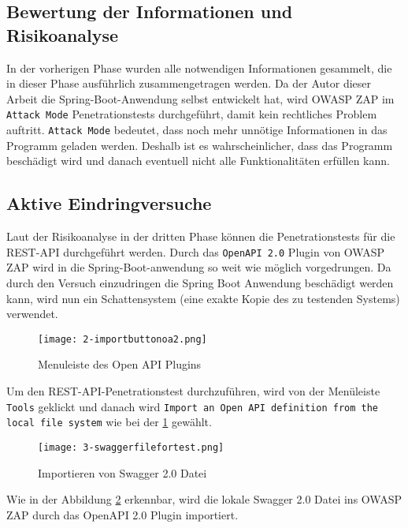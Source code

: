 \subsection{Bewertung der Informationen und Risikoanalyse}

In der vorherigen Phase wurden alle notwendigen Informationen gesammelt, die in dieser Phase ausführlich zusammengetragen werden. Da der Autor dieser Arbeit die Spring-Boot-Anwendung selbst entwickelt hat, wird OWASP ZAP im \texttt{Attack Mode} Penetrationstests durchgeführt, damit kein rechtliches Problem auftritt. \texttt{Attack Mode} bedeutet, dass noch mehr unnötige Informationen in das Programm geladen werden. Deshalb ist es wahrscheinlicher, dass das Programm beschädigt wird und danach eventuell nicht alle Funktionalitäten erfüllen kann.

\subsection{Aktive Eindringversuche}

Laut der Risikoanalyse in der dritten Phase können die Penetrationstests für die REST-API durchgeführt werden. Durch das \texttt{OpenAPI 2.0} Plugin von OWASP ZAP wird in die Spring-Boot-anwendung so weit wie möglich vorgedrungen. Da durch den Versuch einzudringen die Spring Boot Anwendung beschädigt werden kann, wird nun ein Schattensystem (eine exakte Kopie des zu testenden Systems) verwendet.\\

\newpage

\begin{figure}[h]
	\centering
	\texttt{[image: 2-importbuttonoa2.png]}
	\caption{Menuleiste des Open API Plugins}
	\label{swaggerimport1}
\end{figure}

Um den REST-API-Penetrationstest durchzuführen, wird von der Menüleiste \texttt{Tools} geklickt und danach wird \texttt{Import an Open API definition from the local file system} wie bei der \ref{swaggerimport1} gewählt.

\begin{figure}[h]
	\centering
	\texttt{[image: 3-swaggerfilefortest.png]}
	\caption{Importieren von Swagger 2.0 Datei}
	\label{swaggerimport2}
\end{figure}


Wie in der Abbildung \ref{swaggerimport2} erkennbar, wird die lokale Swagger 2.0 Datei ins OWASP ZAP durch das OpenAPI 2.0 Plugin importiert.

